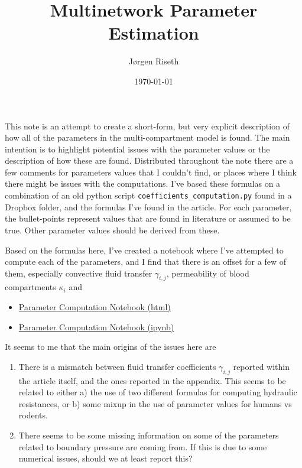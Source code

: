 \documentclass{article}
\title{Multinetwork Parameter Estimation}
\author{Jørgen Riseth}
\date{\today}
\theoremstyle{definition}
\theoremstyle{plain}
\theoremstyle{remark}
\begin{document}
\maketitle

This note is an attempt to create a short-form, but very explicit description of how all of the parameters in the multi-compartment model is found. The main intention is to highlight potential issues with the parameter values or the description of how these are found. Distributed throughout the note there are a few comments for parameters values that I couldn't find, or places where I think there might be issues with the computations. I've based these formulas on a combination of an old python script \texttt{coefficients\_computation.py} found in a Dropbox folder, and the formulas I've found in the article. For each parameter, the bullet-points represent values that are found in literature or assumed to be true. Other parameter values should be derived from these.

Based on the formulas here, I've created a notebook where I've attempted to compute each of the parameters, and I find that there is an offset for a few of them,  especially convective fluid transfer $ \gamma_{i,j}$, permeability of blood compartments $\kappa_i$ and 
\begin{itemize}
    \item \href{https://github.com/jorgenriseth/multicompartment-solute-transport/blob/main/notes-and-notebooks/ParameterNotebook.html}{Parameter Computation Notebook (html)}
    \item \href{https://github.com/jorgenriseth/multicompartment-solute-transport/blob/main/notes-and-notebooks/Parameters.ipynb}{Parameter Computation Notebook (ipynb)}
\end{itemize}

It seems to me that the main origins of the issues here are 
\begin{enumerate}
    \item There is a mismatch between fluid transfer coefficients $\gamma_{i,j}$ reported within the article itself, and the ones reported in the appendix. This seems to be related to either a) the use of two different formulas for computing hydraulic resistances, or b) some mixup in the use of parameter values for humans vs rodents.
    \item There seems to be some missing information on some of the parameters related to boundary pressure are coming from. If this is due to some numerical issues, should we at least report this?
\end{enumerate}
\end{document}
